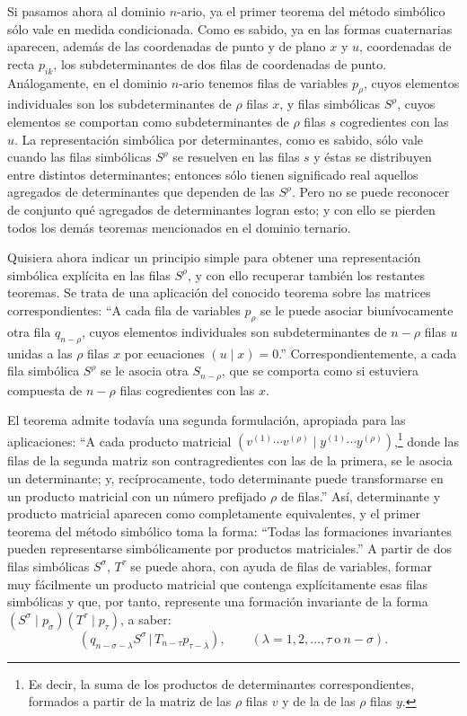 \documentclass[11pt]{article}
\newcommand{\pair}[2]{(#1\,|\,#2)}
\begin{document}
Si pasamos ahora al dominio $n$-ario, ya el primer teorema del método simbólico sólo vale en medida condicionada. Como es sabido, ya en las formas cuaternarias aparecen, además de las coordenadas de punto y de plano $x$ y $u$, coordenadas de recta $p_{ik}$, los subdeterminantes de dos filas de coordenadas de punto. Análogamente, en el dominio $n$-ario tenemos filas de variables $p_\rho$, cuyos elementos individuales son los subdeterminantes de $\rho$ filas $x$, y filas simbólicas $S^\rho$, cuyos elementos se comportan como subdeterminantes de $\rho$ filas $s$ cogredientes con las $u$. La representación simbólica por determinantes, como es sabido, sólo vale cuando las filas simbólicas $S^\rho$ se resuelven en las filas $s$ y éstas se distribuyen entre distintos determinantes; entonces sólo tienen significado real aquellos agregados de determinantes que dependen de las $S^\rho$. Pero no se puede reconocer de conjunto qué agregados de determinantes logran esto; y con ello se pierden todos los demás teoremas mencionados en el dominio ternario.

Quisiera ahora indicar un principio simple para obtener una representación simbólica explícita en las filas $S^\rho$, y con ello recuperar también los restantes teoremas. Se trata de una aplicación del conocido teorema sobre las matrices correspondientes: ``A cada fila de variables $p_\rho$ se le puede asociar biunívocamente otra fila $q_{n-\rho}$, cuyos elementos individuales son subdeterminantes de $n-\rho$ filas $u$ unidas a las $\rho$ filas $x$ por ecuaciones $(u\mid x)=0$.'' Correspondientemente, a cada fila simbólica $S^\rho$ se le asocia otra $S_{n-\rho}$, que se comporta como si estuviera compuesta de $n-\rho$ filas cogredientes con las $x$.

El teorema admite todavía una segunda formulación, apropiada para las aplicaciones: ``A cada producto matricial $(v^{(1)}\cdots v^{(\rho)}\mid y^{(1)}\cdots y^{(\rho)})$,\footnote{Es decir, la suma de los productos de determinantes correspondientes, formados a partir de la matriz de las $\rho$ filas $v$ y de la de las $\rho$ filas $y$.} donde las filas de la segunda matriz son contragredientes con las de la primera, se le asocia un determinante; y, recíprocamente, todo determinante puede transformarse en un producto matricial con un número prefijado $\rho$ de filas.'' Así, determinante y producto matricial aparecen como completamente equivalentes, y el primer teorema del método simbólico toma la forma: ``Todas las formaciones invariantes pueden representarse simbólicamente por productos matriciales.'' A partir de dos filas simbólicas $S^\sigma$, $T^\tau$ se puede ahora, con ayuda de filas de variables, formar muy fácilmente un producto matricial que contenga explícitamente esas filas simbólicas y que, por tanto, represente una formación invariante de la forma $(S^\sigma\mid p_\sigma)(T^\tau\mid p_\tau)$, a saber:
\begin{equation}
 \pair{q_{n-\sigma-\lambda}S^\sigma}{T_{n-\tau}p_{\tau-\lambda}},
 \qquad (\lambda=1,2,\ldots,\tau\ \text{o}\ n-\sigma).
\tag{1}
\end{equation}
\end{document}
